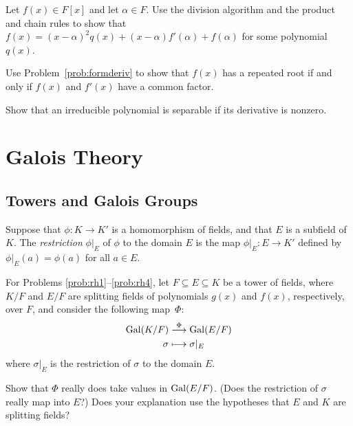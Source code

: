 \begin{problem}\label{prob:formderiv}
Let $f(x) \in F[x]$ and let $\alpha \in F$.  Use the division algorithm and the product and chain rules to show that $f(x) = (x-\alpha)^2 q(x) +(x-\alpha)f'(\alpha) + f(\alpha)$ for some polynomial $q(x)$.
\end{problem}



\begin{problem}
    Use Problem~\ref{prob:formderiv} to show that $f(x)$ has a repeated root if and only if $f(x)$ and $f'(x)$ have a common factor.
\end{problem}



\begin{problem}
    Show that an irreducible polynomial is separable if its derivative is nonzero.
\end{problem}

\chapter{Galois Theory}\label{chap:galois}

\section{Towers and Galois Groups}

\begin{definition}
    Suppose that $\phi:K \longrightarrow K'$ is a homomorphism of fields, and that $E$ is a subfield of $K$. The \textit{restriction} $\phi|_E$ of $\phi$ to the domain $E$ is the map $\phi|_E : E \longrightarrow K'$ defined by $\phi|_E(a)=\phi(a)$ for all $a\in E$.
\end{definition}

For Problems \ref{prob:rh1}--\ref{prob:rh4},
let $F\subseteq E\subseteq K$ be a tower of fields, where $K/F$ and $E/F$ are splitting fields of polynomials $g(x)$ and $f(x)$, respectively, over $F$, and consider the following map~$\Phi$:
\begin{align*}
\operatorname{Gal}(K/F) &\stackrel{\Phi}{\longrightarrow} \operatorname{Gal}(E/F) \\
\sigma &\longmapsto \sigma|_E
\end{align*}
where $\sigma|_E$ is the restriction of $\sigma$ to the domain $E$.

\begin{problem}\label{prob:rh1}
    Show that $\Phi$ really does take values in $\operatorname{Gal}(E/F)$. (Does the restriction of $\sigma$ really map into $E$?) Does your explanation use the hypotheses that $E$ and $K$ are splitting fields?
\end{problem}


